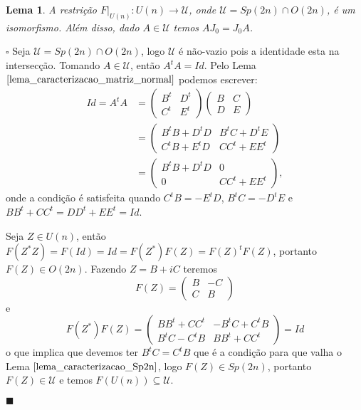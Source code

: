 \documentclass[12pt]{book}
\newtheorem{lema}[teorema]{Lema}
\newenvironment{prova}[1]{$\square$ #1}{\hfill$\blacksquare$}
\newcommand{\gruposimpletico}[1]{Sp(#1)}
\newcommand{\matrizortogonal}[1]{O(#1)}
\newcommand{\matrizunitaria}[1]{U(#1)}
\begin{document}
	\begin{lema}\label{lema_isomorfismo_U}
		A restrição $F|_{\matrizunitaria{n}}: \matrizunitaria{n} \to \mathcal{U}$, onde $\mathcal{U} = \gruposimpletico{2n}\cap \matrizortogonal{2n}$, é um isomorfismo. Além disso, dado $A \in \mathcal{U}$ temos $AJ_{0}=J_{0}A$.
	\end{lema}
	\begin{prova}
		Seja $\mathcal{U} = \gruposimpletico{2n} \cap \matrizortogonal{2n}$, logo $\mathcal{U}$ é não-vazio pois a identidade esta na intersecção. Tomando $A \in \mathcal{U}$, então $A^{t}A= Id$. Pelo Lema $\ref{lema_caracterizacao_matriz_normal}$ podemos escrever:
		$$
			\begin{aligned}
				Id=A^{t}A &=
				\left(
				\begin{array}{cc}
				B^{t} & D^{t}
				\\
				C^{t} & E^{t}
				\end{array}
				\right)
				\left(
				\begin{array}{cc}
				B & C
				\\
				D & E
				\end{array}
				\right)
			\\
			&= 
			\left(
			\begin{array}{cc}
			B^{t}B + D^{t}D & B^{t}C + D^{t}E 
			\\
			C^{t}B + E^{t}D  & CC^{t}+EE^{t}
			\end{array}
			\right)
			\\
			&=
			\left(
			\begin{array}{cc}
			B^{t}B + D^{t}D & 0 
			\\
			0 & CC^{t}+EE^{t}
			\end{array}
			\right),
			\end{aligned}
		$$
		onde a condição é satisfeita quando $C^{t}B =- E^{t}D$, $B^{t}C =- D^{t}E$ e $BB^{t} + CC^{t} = DD^{t}+EE^{t} = Id$. 
		
		Seja $Z \in \matrizunitaria{n}$, então $F(Z^{*}Z) = F(Id) = Id = F(Z^{*})F(Z) = F(Z)^{t}F(Z)$, portanto $F(Z) \in \matrizortogonal{2n}$. Fazendo $Z= B+iC$ teremos
		$$
		F(Z)=
		\left(
		\begin{array}{cc}
		B & -C
		\\
		C & B
		\end{array}
		\right)
		$$
		e
		$$
		F(Z^{*})F(Z)=
		\left(
		\begin{array}{cc}
		BB^{t} +CC^{t} & -B^{t}C +C^{t}B
		\\
		B^{t}C -C^{t}B & BB^{t} +CC^{t}
		\end{array}
		\right)	
		= Id
		$$
		o que implica que devemos ter $B^{t}C =C^{t}B$ que é a condição para que valha o Lema $\ref{lema_caracterizacao_Sp2n}$, logo $F(Z) \in \gruposimpletico{2n}$, portanto $F(Z) \in \mathcal{U}$ e temos $F(\matrizunitaria{n}) \subseteq \mathcal{U}$.
		

\end{prova}
\end{document}

